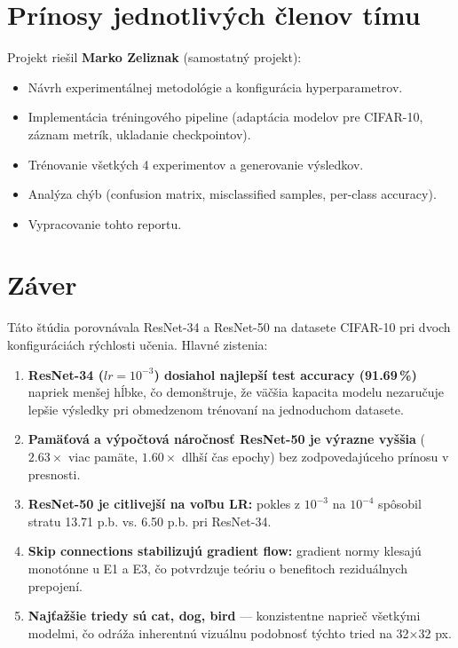 \documentclass[12pt,a4paper]{article}
\begin{document}
\section{Prínosy jednotlivých členov tímu}

Projekt riešil \textbf{Marko Zeliznak} (samostatný projekt):
\begin{itemize}
  \item Návrh experimentálnej metodológie a konfigurácia hyperparametrov.
  \item Implementácia tréningového pipeline (adaptácia modelov pre CIFAR-10,
        záznam metrík, ukladanie checkpointov).
  \item Trénovanie všetkých 4 experimentov a generovanie výsledkov.
  \item Analýza chýb (confusion matrix, misclassified samples, per-class accuracy).
  \item Vypracovanie tohto reportu.
\end{itemize}

\section{Záver}

Táto štúdia porovnávala ResNet-34 a ResNet-50 na datasete CIFAR-10 pri dvoch
konfiguráciách rýchlosti učenia. Hlavné zistenia:

\begin{enumerate}
  \item \textbf{ResNet-34 ($lr = 10^{-3}$) dosiahol najlepší test accuracy (91.69\,\%)}
        napriek menšej hĺbke, čo demonštruje, že väčšia kapacita modelu nezaručuje
        lepšie výsledky pri obmedzenom trénovaní na jednoduchom datasete.
  \item \textbf{Pamäťová a výpočtová náročnosť ResNet-50 je výrazne vyššia}
        ($2.63\times$ viac pamäte, $1.60\times$ dlhší čas epochy) bez zodpovedajúceho
        prínosu v presnosti.
  \item \textbf{ResNet-50 je citlivejší na voľbu LR:} pokles z $10^{-3}$ na $10^{-4}$
        spôsobil stratu 13.71 p.b. vs. 6.50 p.b. pri ResNet-34.
  \item \textbf{Skip connections stabilizujú gradient flow:} gradient normy klesajú
        monotónne u E1 a E3, čo potvrdzuje teóriu o benefitoch reziduálnych prepojení.
  \item \textbf{Najťažšie triedy sú cat, dog, bird} — konzistentne naprieč všetkými
        modelmi, čo odráža inherentnú vizuálnu podobnosť týchto tried na 32×32 px.
\end{enumerate}
\end{document}
